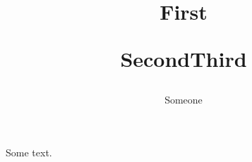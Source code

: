 \documentclass{memoir}
\title{First\par Second\endgraf Third}
\author{Someone}
\begin{document}
\maketitle
Some text.
\end{document}

